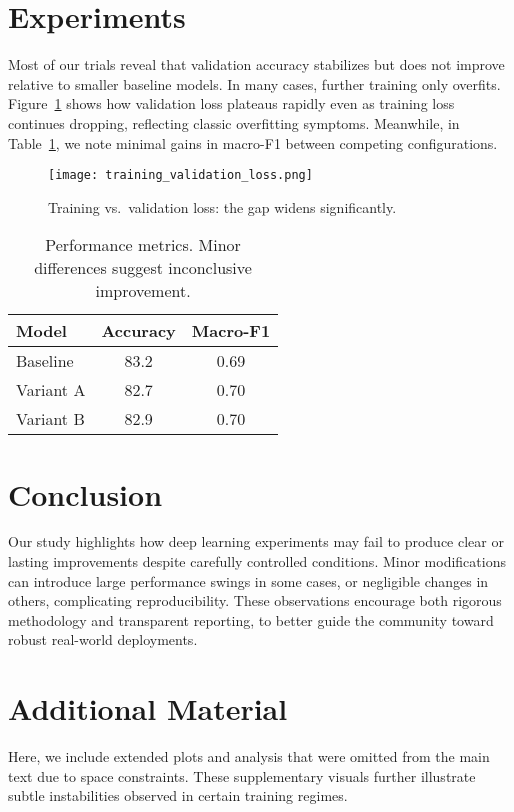 \documentclass[11pt]{article}
\begin{document}
\section{Experiments}
Most of our trials reveal that validation accuracy stabilizes but does not improve relative to smaller baseline models. In many cases, further training only overfits. 
Figure~\ref{fig:loss_plot} shows how validation loss plateaus rapidly even as training loss continues dropping, reflecting classic overfitting symptoms. 
Meanwhile, in Table~\ref{tab:main_results}, we note minimal gains in macro-F1 between competing configurations.

\begin{figure}[h!]
\centering
\texttt{[image: training\_validation\_loss.png]}
\caption{Training vs.\ validation loss: the gap widens significantly.}
\label{fig:loss_plot}
\end{figure}

\vspace{0.5em}
\begin{table}[h!]
\centering
\begin{tabular}{l|c|c}
\hline
Model & Accuracy & Macro-F1 \\
\hline
Baseline & 83.2 & 0.69 \\
Variant A & 82.7 & 0.70 \\
Variant B & 82.9 & 0.70 \\
\hline
\end{tabular}
\caption{Performance metrics. Minor differences suggest inconclusive improvement.}
\label{tab:main_results}
\end{table}

\section{Conclusion}
Our study highlights how deep learning experiments may fail to produce clear or lasting improvements despite carefully controlled conditions. Minor modifications can introduce large performance swings in some cases, or negligible changes in others, complicating reproducibility. These observations encourage both rigorous methodology and transparent reporting, to better guide the community toward robust real-world deployments.

\appendix
\section{Additional Material}
Here, we include extended plots and analysis that were omitted from the main text due to space constraints. 
These supplementary visuals further illustrate subtle instabilities observed in certain training regimes.



\end{document}
